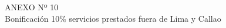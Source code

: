 \begin{center}
    \vspace*{\fill} %
    \Huge %
    ANEXO Nº 10 \\
    Bonificación 10\% servicios prestados fuera de Lima y Callao
    \vspace*{\fill} %
\end{center}